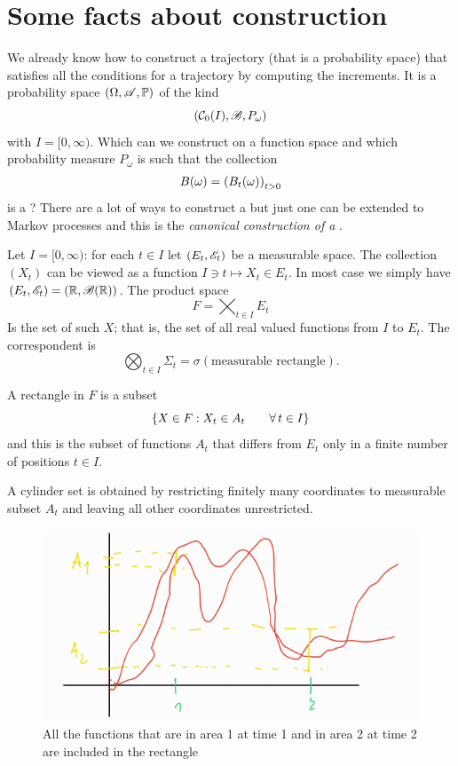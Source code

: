 \documentclass[12pt]{report}
\begin{document}
\section{Some facts about \bwm{} construction}
We already know how to construct a trajectory (that is a probability space) that satisfies all the conditions for a \bwm{} trajectory by computing the increments. It is a probability space $(\Omega,\mathscr{A},\mathbb{P})$ of the kind
\begin{equation*}
	\left(\mathcal{C}_{0}(I),\mathscr{B},P_{\omega}\right)
\end{equation*}
with $I=[0,\infty)$. Which \sa{} can we construct on a function space and which probability measure $P_{\omega}$ is such that the collection
\begin{equation*}
	B(\omega)={\left(B_{t}(\omega)\right)}_{t>0}
\end{equation*}
is a \bwm? There are a lot of ways to construct a \bwm{} but just one can be extended to Markov processes and this is the \emph{canonical construction of a \bwm}. \par
Let $I=[0,\infty)$: for each $t\in I$ let $(E_{t},\mathscr{E}_{t})$ be a measurable space. The collection ${\left(X_{t}\right)}$ can be viewed as a function $I\ni t\mapsto X_{t}\in E_{t}$. In most case we simply have $(E_{t},\mathscr{E}_{t})=(\mathbb{R},\mathscr{B}(\mathbb{R}))$. The product space 
\begin{equation*}
	F=\bigtimes_{t\in I}E_{t}
\end{equation*}
Is the set of such $X$; that is, the set of all real valued functions from $I$ to $E_{t}$. The correspondent \sa{} is 
\begin{equation*}
	\bigotimes_{t\in I}\Sigma_{t}=\sigma(\text{measurable rectangle}).
\end{equation*}
\begin{definition}
	A rectangle in $F$ is a subset
	\begin{equation*}
		\left\{X\in F:X_{t}\in A_{t}\qquad\forall\, t\in I\right\}
	\end{equation*}
	and this is the subset of functions $A_{t}$ that differs from $E_{t}$ only in a finite number of positions $t\in I$.
\end{definition}
A cylinder set is obtained by restricting finitely many coordinates to measurable subset $A_{t}$
and leaving all other coordinates unrestricted.
\begin{figure}[h]
	\centering
	\includegraphics[width=0.7\linewidth]{img/screenshot001}
	\caption{All the functions that are in area 1 at time 1 and in area 2 at time 2 are included in the rectangle}
	\label{fig:screenshot001}
\end{figure}
\end{document}
